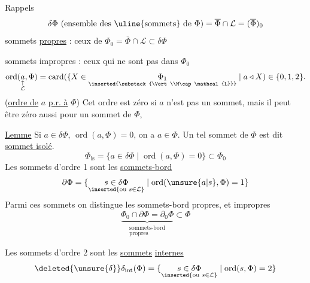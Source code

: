 Rappels
\[
\delta\Phi\ (\text{ensemble des \uline{sommets} de }\Phi)=\overline{\Phi}\cap\mathcal{L}=(\overline{\Phi})_0
\]
sommets \uline{propres} : ceux de $\Phi_0=\overline{\Phi}\cap\mathcal{L}\subset\delta\Phi$

sommets impropres : ceux qui ne sont pas dans $\Phi_0$
\[
\operatorname{ord}(\underset{\substack{\uparrow\\\mathcal{L}}}{a},\Phi)=\operatorname{card}(\{X\in\underset{\inserted{\substack{\Vert\\M\cap\mathcal{L}}}}{\Phi_1}\mid a\triangleleft X)\in\{0,1,2\}.
\]
(\uline{ordre de} $a$ \uline{p.r. à} $\Phi$) Cet ordre est zéro si $a$ n'est pas un sommet, mais il peut être zéro aussi pour un sommet de $\Phi$, 

\uline{Lemme} Si $a\in\delta\Phi$,  $\operatorname{ord}(a,\Phi)=0$, on a $a\in\Phi$.
Un tel sommet de $\Phi$ est dit \uline{sommet isolé}.
\[
\Phi_{\mathrm{is}}=\{a\in\delta\Phi\mid\operatorname{ord}(a,\Phi)=0\}\subset\Phi_0
\]
Les sommets d'ordre 1 sont les \uline{sommets-bord}
\[
\partial\Phi=\{\underset{\inserted{\text{ou }s\in\mathcal{L}}}{s\in\delta\Phi}\mid\operatorname{ord}(\unsure{a|s},\Phi)=1\}
\]
Parmi ces sommets on distingue les sommets-bord propres, et impropres
\[
\underbrace{\Phi_0\cap\partial\Phi=\partial_0\Phi}_{\substack{\text{sommets-bord}\\\text{propres}}}\subset\Phi
\]

Les sommets d'ordre 2 sont les \uline{sommets} \uline{internes}
\[
\deleted{\unsure{\delta}}\delta_{\mathrm{int}}(\Phi)=\{\underset{\inserted{\text{ou }s\in\mathcal{L}}}{s\in\delta\Phi}\mid\operatorname{ord}(s,\Phi)=2\}
\]
